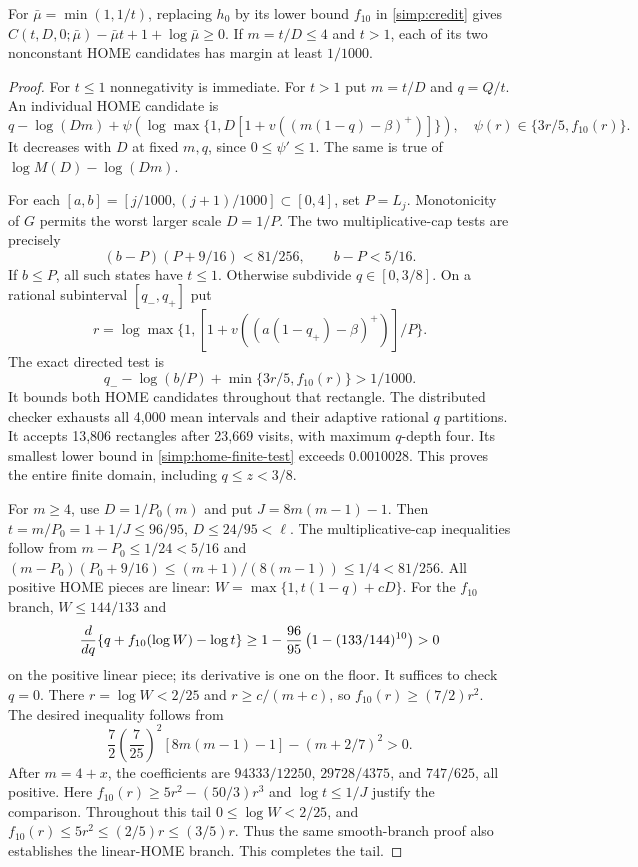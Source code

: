 \begin{lemma}\label{simp:base-endpoint}
For $\bar\mu=\min(1,1/t)$, replacing $h_0$ by its lower bound $f_{10}$
in \eqref{simp:credit} gives
$C(t,D,0;\bar\mu)-\bar\mu t+1+\log\bar\mu\ge0$.
If $m=t/D\le4$ and $t>1$, each of its two nonconstant HOME candidates
has margin at least $1/1000$.
\end{lemma}
\begin{proof}
For $t\le1$ nonnegativity is immediate.  For $t>1$ put $m=t/D$ and
$q=Q/t$.  An individual HOME candidate is
\[
 q-\log(Dm)+\psi(\log\max\{1,D[1+v((m(1-q)-\beta)^+)]\}),
 \quad \psi(r)\in\{3r/5,f_{10}(r)\}.
\]
It decreases with $D$ at fixed $m,q$, since $0\le\psi'\le1$.
The same is true of $\log M(D)-\log(Dm)$.

For each $[a,b]=[j/1000,(j+1)/1000]\subset[0,4]$, set $P=L_j$.
Monotonicity of $G$ permits the worst larger scale $D=1/P$.
The two multiplicative-cap tests are precisely
\[
 (b-P)(P+9/16)<81/256,\qquad b-P<5/16.
\]
If $b\le P$, all such states have $t\le1$.  Otherwise subdivide
$q\in[0,3/8]$.  On a rational subinterval $[q_-,q_+]$ put
\[
 r=\log\max\{1,[1+v((a(1-q_+)-\beta)^+)]/P\}.
\]
The exact directed test is
\begin{equation}\label{simp:home-finite-test}
 q_--\log(b/P)+\min\{3r/5,f_{10}(r)\}>1/1000.
\end{equation}
It bounds both HOME candidates throughout that rectangle.
The distributed checker exhausts all 4,000 mean intervals and their
adaptive rational $q$ partitions.  It accepts 13,806 rectangles after
23,669 visits, with maximum $q$-depth four.  Its smallest lower bound
in \eqref{simp:home-finite-test} exceeds $0.0010028$.
This proves the entire finite domain, including $q\le z<3/8$.

For $m\ge4$, use $D=1/P_0(m)$ and put $J=8m(m-1)-1$.
Then $t=m/P_0=1+1/J\le96/95$, $D\le24/95<\ell$.
The multiplicative-cap inequalities follow from
$m-P_0\le1/24<5/16$ and
$(m-P_0)(P_0+9/16)\le(m+1)/(8(m-1))\le1/4<81/256$.
All positive HOME pieces are linear:
$W=\max\{1,t(1-q)+cD\}$.
For the $f_{10}$ branch, $W\le144/133$ and
\[
 {d\over dq}\{q+f_{10}(\log W)-\log t\}
 \ge1-{96\over95}\left(1-(133/144)^{10}\right)>0
\]
on the positive linear piece; its derivative is one on the floor.
It suffices to check $q=0$.
There $r=\log W<2/25$ and
$r\ge c/(m+c)$, so $f_{10}(r)\ge(7/2)r^2$.
The desired inequality follows from
\[
 \frac72\left(\frac7{25}\right)^2[8m(m-1)-1]-(m+2/7)^2>0.
\]
After $m=4+x$, the coefficients are
$94333/12250$, $29728/4375$, and $747/625$, all positive.
Here $f_{10}(r)\ge5r^2-(50/3)r^3$ and
$\log t\le1/J$ justify the comparison.
Throughout this tail $0\le\log W<2/25$, and
$f_{10}(r)\le5r^2\le(2/5)r\le(3/5)r$.
Thus the same smooth-branch proof also establishes the linear-HOME
branch.  This completes the tail.
\end{proof}

